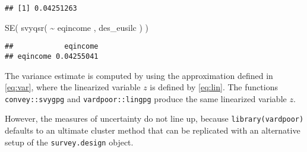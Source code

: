 \documentclass[
]{book}
\newenvironment{Shaded}{\begin{snugshade}}{\end{snugshade}}
\newcommand{\FunctionTok}[1]{\textcolor[rgb]{0.00,0.00,0.00}{#1}}
\newcommand{\NormalTok}[1]{#1}
\newcommand{\SpecialCharTok}[1]{\textcolor[rgb]{0.00,0.00,0.00}{#1}}
\begin{document}
\begin{verbatim}
## [1] 0.04251263
\end{verbatim}

\begin{Shaded}
\begin{Highlighting}[]
\FunctionTok{SE}\NormalTok{( }\FunctionTok{svyqsr}\NormalTok{( }\SpecialCharTok{\textasciitilde{}}\NormalTok{ eqincome , des\_eusilc ) )}
\end{Highlighting}
\end{Shaded}

\begin{verbatim}
##            eqincome
## eqincome 0.04255041
\end{verbatim}

The variance estimate is computed by using the approximation defined in \eqref{eq:var}, where the linearized variable \(z\) is defined by \eqref{eq:lin}. The functions \texttt{convey::svygpg} and \texttt{vardpoor::lingpg} produce the same linearized variable \(z\).

However, the measures of uncertainty do not line up, because \texttt{library(vardpoor)} defaults to an ultimate cluster method that can be replicated with an alternative setup of the \texttt{survey.design} object.
\end{document}
